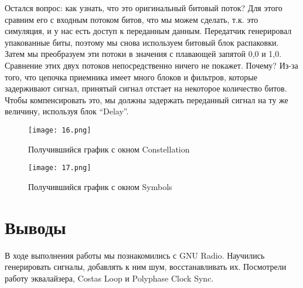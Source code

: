 \documentclass[a4paper,12pt]{report}
\begin{document}
Остался вопрос: как узнать, что это оригинальный битовый поток? Для этого сравним его с входным потоком битов, что мы можем сделать, т.к. это симуляция, и у нас есть доступ к переданным данным. Передатчик генерировал упакованные биты, поэтому мы снова используем битовый блок распаковки. Затем мы преобразуем эти потоки в значения с плавающей запятой 0,0 и 1,0. Сравнение этих двух потоков непосредственно ничего не покажет. Почему? Из-за того, что цепочка приемника имеет много блоков и фильтров, которые задерживают сигнал, принятый сигнал отстает на некоторое количество битов. Чтобы компенсировать это, мы должны задержать переданный сигнал на ту же величину, используя блок “Delay”.  
\begin{figure}[H]
        \centering
        \texttt{[image: 16.png]}
        \caption{Получившийся график с окном Constellation}
        \label{fig:ig4_1}
\end{figure}
 
\begin{figure}[H]
        \centering
        \texttt{[image: 17.png]}
        \caption{Получившийся график с окном Symbols}
        \label{fig:ig4_1}
\end{figure}

\section{Выводы}

В ходе выполнения работы мы познакомились с GNU Radio. Научились генерировать сигналы, добавлять к ним шум, восстанавливать их. Посмотрели работу эквалайзера, Costas Loop и Polyphase Clock Sync.
\end{document}
